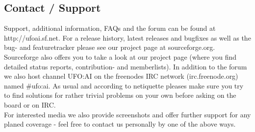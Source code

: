 \subsection{Contact / Support}
Support, additional information, FAQs and the forum can be found at http://ufoai.sf.net. %
For a release history, latest releases and bugfixes as well as the bug- and featuretracker please see our project page at sourceforge.org. %
Sourceforge also offers you to take a look at our project page (where you find detailed status reports, contribution- and memberlists). In addition to the forum we also host channel UFO:AI on the freenodes IRC network (irc.freenode.org) named \#ufo:ai. As usual and according to netiquette pleases make sure you try to find solutions for rather trivial problems on your own before asking on the board or on IRC.\\
For interested media we also provide screenshots and offer further support for any planed coverage - feel free to contact us personally by one of the above ways.
